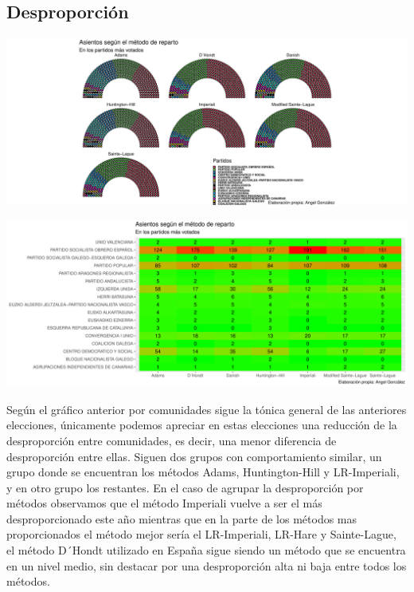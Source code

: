 \documentclass[12pt,a4paper,]{book}
\numberwithin{dummy}{section}
\theoremstyle{ocrenumbox}
\theoremstyle{blacknumex}
\theoremstyle{blacknumbox}
\theoremstyle{ocrenum}
\theoremstyle{ocrenum}
\begin{document}
\hypertarget{desproporciuxf3n-8}{%
\subsection{Desproporción}\label{desproporciuxf3n-8}}

\begin{center}\includegraphics[width=1\linewidth]{figurasR/unnamed-chunk-98-1} \end{center}

\begin{center}\includegraphics[width=1\linewidth]{figurasR/unnamed-chunk-98-2} \end{center}

Según el gráfico anterior por comunidades sigue la tónica general de las
anteriores elecciones, únicamente podemos apreciar en estas elecciones
una reducción de la desproporción entre comunidades, es decir, una menor
diferencia de desproporción entre ellas. Siguen dos grupos con
comportamiento similar, un grupo donde se encuentran los métodos Adams,
Huntington-Hill y LR-Imperiali, y en otro grupo los restantes. En el
caso de agrupar la desproporción por métodos observamos que el método
Imperiali vuelve a ser el más desproporcionado este año mientras que en
la parte de los métodos mas proporcionados el método mejor sería el
LR-Imperiali, LR-Hare y Sainte-Lague, el método D´Hondt utilizado en
España sigue siendo un método que se encuentra en un nivel medio, sin
destacar por una desproporción alta ni baja entre todos los métodos.
\end{document}
